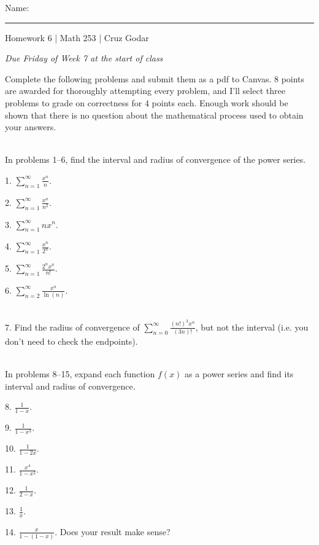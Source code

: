 \documentclass{article}
\begin{document}
\Large Name: \rule{2in}{0.15mm} \hfill Homework 6 | Math 253 | Cruz Godar \vspace{4pt}  \normalsize

\textit{Due Friday of Week 7 at the start of class}

Complete the following problems and submit them as a pdf to Canvas. 8 points are awarded for thoroughly attempting every problem, and I'll select three problems to grade on correctness for 4 points each. Enough work should be shown that there is no question about the mathematical process used to obtain your answers.

~\\

In problems 1--6, find the interval and radius of convergence of the power series.

1. $\displaystyle \sum_{n = 1}^\infty \frac{x^n}{n}$.

2. $\displaystyle \sum_{n = 1}^\infty \frac{x^n}{n^2}$.

3. $\displaystyle \sum_{n = 1}^\infty nx^n$.

4. $\displaystyle \sum_{n = 1}^\infty \frac{x^n}{2^n}$.

5. $\displaystyle \sum_{n = 1}^\infty \frac{2^n x^n}{n!}$.

6. $\displaystyle \sum_{n = 2}^\infty \frac{x^n}{\ln(n)}$.

~\\

7. Find the radius of convergence of $\displaystyle \sum_{n = 0}^\infty \frac{(n!)^3 x^n}{(3n)!}$, but not the interval (i.e. you don't need to check the endpoints).

~\\

In problems 8--15, expand each function $f(x)$ as a power series and find its interval and radius of convergence.

8. $\displaystyle \frac{1}{1 - x}$.

9. $\displaystyle \frac{1}{1 - x^3}$.

10. $\displaystyle \frac{1}{1 - 2x}$.

11. $\displaystyle \frac{x^4}{1 - x^2}$.

12. $\displaystyle \frac{1}{2 - x}$.

13. $\displaystyle \frac{1}{x}$.

14. $\displaystyle \frac{x}{1 - (1 - x)}$. Does your result make sense?

~\\
\end{document}
